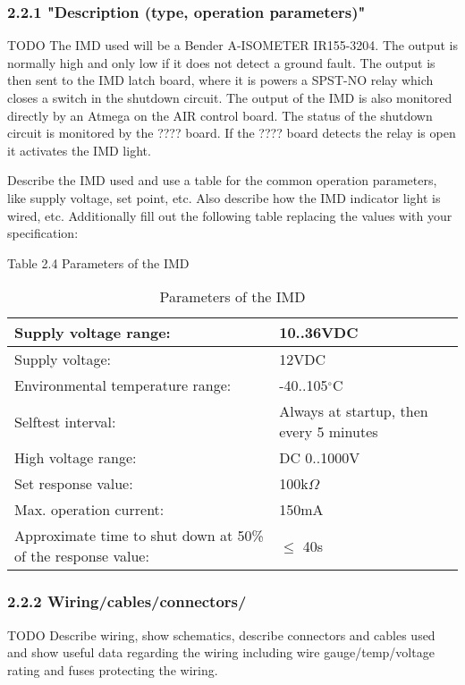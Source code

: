\documentclass{article}
\begin{document}
\subsubsection*{2.2.1 "Description (type, operation parameters)"}

TODO
The IMD used will be a Bender A-ISOMETER IR155-3204. The output is normally high and only low if it does not detect a ground fault. The output is then sent to the IMD latch board, where it is powers a SPST-NO relay which closes a switch in the shutdown circuit. The output of the IMD is also monitored directly by an Atmega on the AIR control board. The status of the shutdown circuit is monitored by the ???? board. If the ???? board detects the relay is  open it activates the IMD light.


Describe the IMD used and use a table for the common operation parameters, like supply voltage, set point, etc. Also describe how the IMD indicator light is wired, etc.
Additionally fill out the following table replacing the values with your specification:


Table 2.4 Parameters of the IMD
\begin{center}
	\begin{table}
		\begin{tabular}{|l|l|}
			\hline
			Supply voltage range: &  10..36VDC \\
			\hline
			Supply voltage: &  12VDC\\
			\hline
			Environmental temperature range: &  -40..105$^{\circ}$C \\
			\hline
			Selftest interval: &  Always at startup, then every 5 minutes \\
			\hline
			High voltage range: &  DC 0..1000V \\
			\hline
			Set response value: &  100k$\Omega$ \\
			\hline
			Max. operation current: &  150mA \\
			\hline
			Approximate time to shut down at 50\% of the response value:&  $\leq$ 40s \\
			\hline
		\end{tabular}
		\caption{Parameters of the IMD}
	\end{table}
\end{center}







\subsubsection*{2.2.2 Wiring/cables/connectors/}
TODO
Describe wiring, show schematics, describe connectors and cables used and show useful data regarding the wiring including wire gauge/temp/voltage rating and fuses protecting the wiring.
\end{document}
